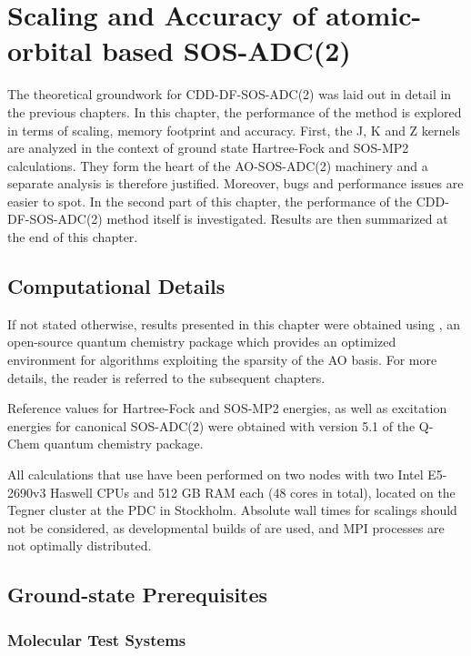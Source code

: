 \chapter{Scaling and Accuracy of atomic-orbital based SOS-ADC(2) \label{cha:RESULTS}}

The theoretical groundwork for CDD-DF-SOS-ADC(2) was laid out in detail in the previous chapters. In this chapter, the performance of the method is explored in terms of scaling, memory footprint and accuracy. First, the J, K and Z kernels are analyzed in the context of ground state Hartree-Fock and SOS-MP2 calculations. They form the heart of the AO-SOS-ADC(2) machinery and a separate analysis is therefore justified. Moreover, bugs and performance issues are easier to spot. In the second part of this chapter, the performance of the CDD-DF-SOS-ADC(2) method itself is investigated. Results are then summarized at the end of this chapter. 

\section{Computational Details}

If not stated otherwise, results presented in this chapter were obtained using \mchem{}, an open-source quantum chemistry package which provides an optimized environment for algorithms exploiting the sparsity of the AO basis. For more details, the reader is referred to the subsequent chapters.

Reference values for Hartree-Fock and SOS-MP2 energies, as well as excitation energies for canonical SOS-ADC(2) were obtained with version 5.1 of the Q-Chem quantum chemistry package.

All calculations that use \mchem{} have been performed on two nodes with two Intel E5-2690v3 Haswell CPUs and 512 GB RAM each (48 cores in total), located on the Tegner cluster at the PDC in Stockholm. Absolute wall times for scalings should not be considered, as developmental builds of \mchem{} are used, and MPI processes are not optimally distributed.  

\section{Ground-state Prerequisites}

\subsection{Molecular Test Systems}

